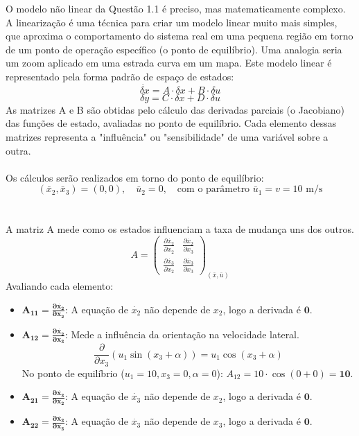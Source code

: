 \documentclass[a4paper,11pt]{article}
\begin{document}
O modelo não linear da Questão 1.1 é preciso, mas matematicamente complexo. A linearização é uma técnica para criar um modelo linear muito mais simples, que aproxima o comportamento do sistema real em uma pequena região em torno de um ponto de operação específico (o ponto de equilíbrio). Uma analogia seria um zoom aplicado em uma estrada curva em um mapa. Este modelo linear é representado pela forma padrão de espaço de estados:
$$ \dot{\delta x} = A \cdot \delta x + B \cdot \delta u $$
$$ \delta y = C \cdot \delta x + D \cdot \delta u $$
As matrizes A e B são obtidas pelo cálculo das derivadas parciais (o Jacobiano) das funções de estado, avaliadas no ponto de equilíbrio. Cada elemento dessas matrizes representa a "influência" ou "sensibilidade" de uma variável sobre a outra.
\\\\
Os cálculos serão realizados em torno do ponto de equilíbrio:
$$ (\bar{x}_2, \bar{x}_3) = (0, 0), \quad \bar{u}_2 = 0, \quad \text{com o parâmetro } \bar{u}_1 = v = 10 \text{ m/s} $$
\\\\
A matriz A mede como os estados influenciam a taxa de mudança uns dos outros.
$$ A = \begin{pmatrix} \frac{\partial \dot{x_2}}{\partial x_2} & \frac{\partial \dot{x_2}}{\partial x_3} \\ \frac{\partial \dot{x_3}}{\partial x_2} & \frac{\partial \dot{x_3}}{\partial x_3} \end{pmatrix}_{(\bar{x}, \bar{u})} $$
Avaliando cada elemento:
\begin{itemize}
    \item $\mathbf{A_{11} = \frac{\partial \dot{x_2}}{\partial x_2}}$: A equação de $\dot{x_2}$ não depende de $x_2$, logo a derivada é $\mathbf{0}$.
    \item $\mathbf{A_{12} = \frac{\partial \dot{x_2}}{\partial x_3}}$: Mede a influência da orientação na velocidade lateral.
    $$ \frac{\partial}{\partial x_3} \left( u_1 \sin(x_3 + \alpha) \right) = u_1 \cos(x_3 + \alpha) $$
    No ponto de equilíbrio ($u_1=10, x_3=0, \alpha=0$): $A_{12} = 10 \cdot \cos(0 + 0) = \mathbf{10}$.
    \item $\mathbf{A_{21} = \frac{\partial \dot{x_3}}{\partial x_2}}$: A equação de $\dot{x_3}$ não depende de $x_2$, logo a derivada é $\mathbf{0}$.
    \item $\mathbf{A_{22} = \frac{\partial \dot{x_3}}{\partial x_3}}$: A equação de $\dot{x_3}$ não depende de $x_3$, logo a derivada é $\mathbf{0}$.
\end{itemize}
\end{document}

